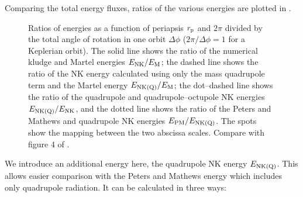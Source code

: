 Comparing the total energy fluxes, ratios of the various energies are plotted in .
\begin{figure}%
  \centering
    \quad
    \caption{Ratios of energies as a function of periapsis $r_\mathrm{p}$ and $2\pi$ divided by the total angle of rotation in one orbit $\Delta\phi$ ($2\pi/\Delta\phi = 1$ for a Keplerian orbit). The solid line shows the ratio of the numerical kludge and Martel energies $E_\mathrm{NK}/E_\mathrm{M}$; the dashed line shows the ratio of the NK energy calculated using only the mass quadrupole term and the Martel energy $E_\mathrm{NK(Q)}/E_\mathrm{M}$; the dot--dashed line shows the ratio of the quadrupole and quadrupole--octupole NK energies $E_\mathrm{NK(Q)}/E_\mathrm{NK}$, and the dotted line shows the ratio of the Peters and Mathews and quadrupole NK energies $E_\mathrm{PM}/E_\mathrm{NK(Q)}$. The spots show the mapping between the two abscissa scales. Compare with figure 4 of \citet{Gair2005}.}
  \label{fig:Energy_ratio}
\end{figure}
We introduce an additional energy here, the quadrupole NK energy $E_\mathrm{NK(Q)}$. This allows easier comparison with the Peters and Mathews energy which includes only quadrupole radiation. It can be calculated in three ways:
